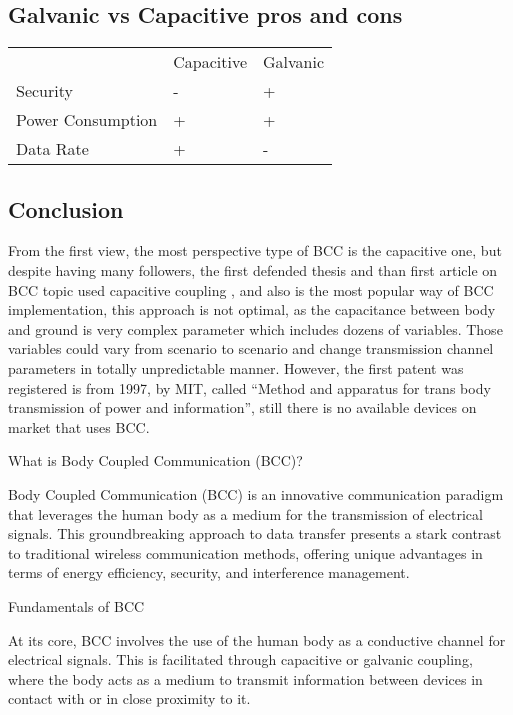 {\subsection{Galvanic vs Capacitive pros and cons}
    \begin{table}[!h]
        \begin{tabular}{lll}
                              & Capacitive & Galvanic     \\
            Security          & -          & +            \\
            Power Consumption & +          & +            \\
            Data Rate         & +          & -           
        \end{tabular}
    \end{table}

\subsection{Conclusion}

\quad From the first view, the most perspective type of BCC is the capacitive one, but despite having many followers, the first defended thesis and than first article on BCC topic used capacitive coupling \cite{bcc_first_thesis}, \cite{bcc_first_article} and also is the most popular way of BCC implementation, this approach is not optimal, as the capacitance between body and ground is very complex parameter which includes dozens of variables. Those variables could vary from scenario to scenario and change transmission channel parameters in totally unpredictable manner. However, the first patent was registered is from 1997, by MIT, called “Method and apparatus for trans body transmission of power and information”, still there is no available devices on market that uses BCC. 




What is Body Coupled Communication (BCC)?

Body Coupled Communication (BCC) is an innovative communication paradigm that leverages the human body as a medium for the transmission of electrical signals. This groundbreaking approach to data transfer presents a stark contrast to traditional wireless communication methods, offering unique advantages in terms of energy efficiency, security, and interference management.

Fundamentals of BCC

At its core, BCC involves the use of the human body as a conductive channel for electrical signals. This is facilitated through capacitive or galvanic coupling, where the body acts as a medium to transmit information between devices in contact with or in close proximity to it.

}
